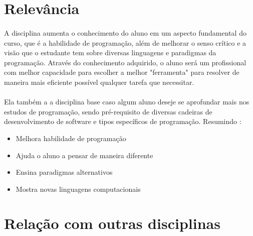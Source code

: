 \documentclass[a4paper]{article}
\begin{document}
\section{Relevância}

\paragraph{} A disciplina aumenta o conhecimento do aluno em um aspecto fundamental do curso, que é a habilidade de programação, além de melhorar o senso crítico e a visão que o estudante tem sobre diversas linguagens e paradigmas da programação. Através do conhecimento adquirido, o aluno será um profissional com melhor capacidade para escolher a melhor "ferramenta" para resolver de maneira mais eficiente possível qualquer tarefa que necessitar.

\paragraph{} Ela também a a disciplina base caso algum aluno deseje se aprofundar mais nos estudos de programação, sendo pré-requisito de diversas cadeiras de desenvolvimento de software e tipos específicos de programação. Resumindo :

\begin{itemize}
\item Melhora habilidade de programação
\item Ajuda o aluno a pensar de maneira diferente
\item Ensina paradigmas alternativos
\item Mostra novas linguagens computacionais
\end{itemize}

\section{Relação com outras disciplinas}
\end{document}
